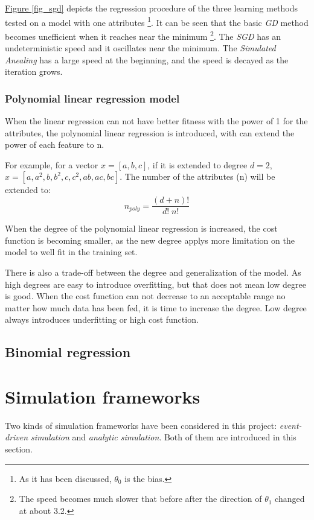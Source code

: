 \documentclass[12pt,a4paper]{report}
\begin{document}
        \hyperref[fig_sgd]{Figure \ref*{fig_sgd}} depicts the regression procedure of the three learning methods tested on a model with one attributes \footnote{As it has been discussed, $\theta_0$ is the bias.}. It can be seen that the basic \emph{GD} method becomes unefficient when it reaches near the minimum \footnote{The speed becomes much slower that before after the direction of $\theta_1$ changed at about 3.2.}. The \emph{SGD} has an undeterministic speed and it oscillates near the minimum. The \emph{Simulated Anealing} has a large speed at the beginning, and the speed is decayed as the iteration grows.

        \subsubsection{Polynomial linear regression model}
        When the linear regression can not have better fitness with the power of 1 for the attributes, the polynomial linear regression is introduced, with can extend the power of each feature to n.

        For example, for a vector $x = [a, b, c]$, if it is extended to degree $d = 2$, $x = [a, a^2, b, b^2, c, c^2, ab, ac, bc]$. The number of the attributes (n) will be extended to:
        \begin{equation}
            n_{poly}=\frac{(d+n)!}{d!\;n!}
        \end{equation}

        When the degree of the polynomial linear regression is increased, the cost function is becoming smaller, as the new degree applys more limitation on the model to well fit in the training set.

        There is also a trade-off between the degree and generalization of the model. As high degrees are easy to introduce overfitting, but that does not mean low degree is good. When the cost function can not decrease to an acceptable range no matter how much data has been fed, it is time to increase the degree. Low degree always introduces underfitting or high cost function.

        \subsection{Binomial regression}
        
        \section{Simulation frameworks}
        Two kinds of simulation frameworks have been considered in this project: \emph{event-driven simulation} and \emph{analytic simulation}.
        Both of them are introduced in this section.
\end{document}
